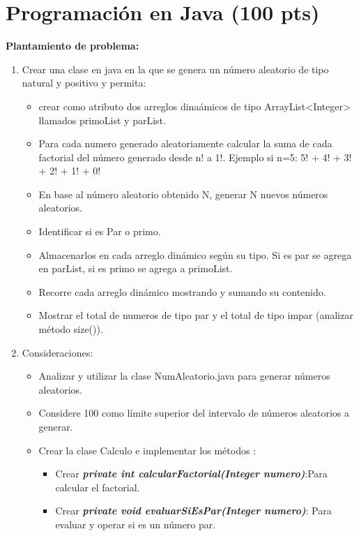 \documentclass{exam}
\begin{document}
\vspace{-7mm}
\section{\textbf{Programaci\'on en Java (100 pts)}}
\noindent
\textbf{Plantamiento de problema: }

\begin{questions}

  \begin{enumerate}
    \item Crear una clase en java en la que se genera un n\'umero aleatorio de tipo natural y positivo y permita:
\begin{itemize}
  \item crear como atributo dos arreglos dina\'amicos  de tipo ArrayList<Integer> llamados primoList y parList.
    \item Para cada numero generado aleatoriamente calcular la suma de cada factorial  del  n\'umero generado desde n! a 1!. Ejemplo si n=5: 5! + 4! + 3! + 2! + 1! + 0!
    \item En base al n\'umero aleatorio obtenido N, generar N nuevos n\'umeros aleatorios.
    \item Identificar si es Par o primo.
    \item Almacenarlos en cada arreglo din\'amico seg\'un su tipo. Si es par se agrega en parList, si es primo se agrega a primoList.
    \item Recorre cada arreglo din\'amico mostrando y sumando su contenido.
    \item Mostrar el total de numeros de tipo par y el total de tipo impar (analizar m\'etodo size()).
\end{itemize}
\item Consideraciones:
  \begin{itemize}
    \item Analizar y utilizar la clase NumAleatorio.java para generar n\'umeros aleatorios.
    \item Considere 100 como l\'imite superior del intervalo de n\'umeros aleatorios a generar.
    \item Crear la clase Calculo e implementar los métodos :
    \begin{itemize}
      \item Crear \textit{\textbf{private int calcularFactorial(Integer numero)}}:Para calcular el factorial.
      \item Crear \textit{\textbf{private void evaluarSiEsPar(Integer numero)}}: Para evaluar y operar si es un n\'umero par.

\end{itemize}
\end{itemize}
\end{enumerate}
\end{questions}
\end{document}
